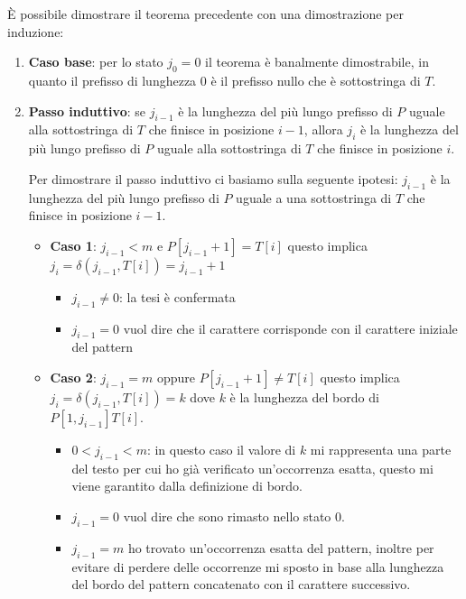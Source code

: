 \begin{dimostrazione}
    È possibile dimostrare il teorema precedente con una dimostrazione per induzione:
    \begin{enumerate}
        \item \textbf{Caso base}: per lo stato $j_0 = 0$ il teorema è banalmente
              dimostrabile, in quanto il prefisso di lunghezza $0$ è il prefisso nullo
              che è sottostringa di $T$.
        \item \textbf{Passo induttivo}: se $j_{i-1}$ è la lunghezza del più lungo
              prefisso di $P$ uguale alla sottostringa di $T$ che finisce in posizione
              $i-1$, allora $j_i$ è la lunghezza del più lungo prefisso di $P$ uguale
              alla sottostringa di $T$ che finisce in posizione $i$.

              Per dimostrare il passo induttivo ci basiamo sulla seguente ipotesi:
              $j_{i-1}$ è la lunghezza del più lungo prefisso di $P$ uguale a una
              sottostringa di $T$ che finisce in posizione $i-1$.
              \begin{itemize}
                  \item \textbf{Caso 1}: $j_{i - 1} < m$ e $P[j_{i - 1} + 1] = T[i]$
                        questo implica $j_i = \delta(j_{i - 1}, T[i]) = j_{i - 1} + 1$
                        \begin{itemize}
                            \item $j_{i - 1} \neq 0$: la tesi è confermata
                            \item $j_{i - 1} = 0$ vuol dire che il carattere
                                  corrisponde con il carattere iniziale del pattern
                        \end{itemize}
                  \item \textbf{Caso 2}: $j_{i - 1} = m$ oppure
                        $P[j_{i - 1} + 1] \neq T[i]$ questo implica
                        $j_i = \delta(j_{i - 1}, T[i]) = k$ dove $k$ è la lunghezza del
                        bordo di $P[1, j_{i - 1}]T[i]$.
                        \begin{itemize}
                            \item $0 < j_{i - 1} < m$: in questo caso il valore
                                  di $k$ mi rappresenta una parte del testo per cui ho
                                  già verificato un'occorrenza esatta, questo mi viene
                                  garantito dalla definizione di bordo.
                            \item $j_{i - 1} = 0$ vuol dire che sono rimasto nello stato 0.
                            \item $j_{i - 1} = m$ ho trovato un'occorrenza esatta
                                  del pattern, inoltre per evitare di perdere delle
                                  occorrenze mi sposto in base alla lunghezza del bordo
                                  del pattern concatenato con il carattere successivo.
                        \end{itemize}
              \end{itemize}
    \end{enumerate}
\end{dimostrazione}
